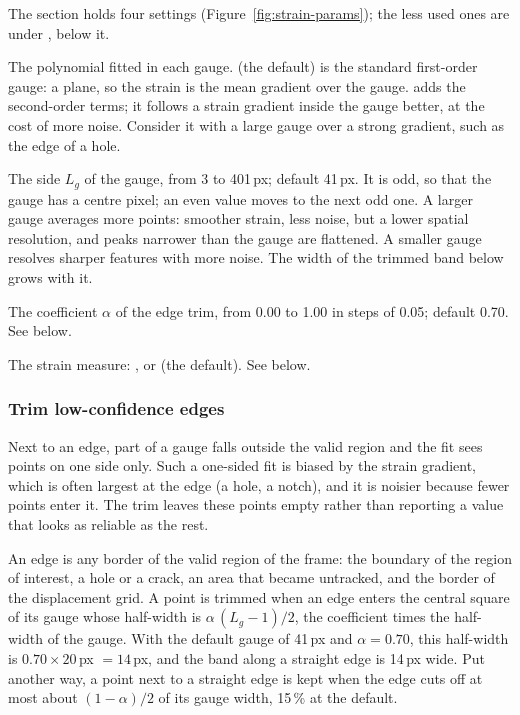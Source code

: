 The section holds four settings (Figure~\ref{fig:strain-params}); the less used ones are under
, below it.

\begin{description}[leftmargin=1.2cm,style=nextline]
  \item[Method]
    The polynomial fitted in each gauge.  (the default) is the standard
    first-order gauge: a plane, so the strain is the mean gradient over the gauge.
     adds the second-order terms; it follows a strain gradient inside the
    gauge better, at the cost of more noise. Consider it with a large gauge over a strong
    gradient, such as the edge of a hole.
  \item[VSG size]
    The side $L_g$ of the gauge, from 3 to 401\,px; default 41\,px. It is odd, so that the gauge
    has a centre pixel; an even value moves to the next odd one. A larger gauge averages more
    points: smoother strain, less noise, but a lower spatial resolution, and peaks narrower than
    the gauge are flattened. A smaller gauge resolves sharper features with more noise. The width
    of the trimmed band below grows with it.
  \item[Trim low-confidence edges]
    The coefficient $\alpha$ of the edge trim, from 0.00 to 1.00 in steps of 0.05; default 0.70.
    See below.
  \item[Strain type]
    The strain measure: ,  or  (the default).
    See below.
\end{description}

\subsubsection*{Trim low-confidence edges}
\label{sec:edge-trim}

Next to an edge, part of a gauge falls outside the valid region and the fit sees points on one
side only. Such a one-sided fit is biased by the strain gradient, which is often largest at the
edge (a hole, a notch), and it is noisier because fewer points enter it. The trim leaves these
points empty rather than reporting a value that looks as reliable as the rest.

An edge is any border of the valid region of the frame: the boundary of the region of interest,
a hole or a crack, an area that became untracked, and the border of the displacement grid. A point
is trimmed when an edge enters the central square of its gauge whose half-width is
$\alpha\,(L_g - 1)/2$, the coefficient times the half-width of the gauge. With the default gauge
of 41\,px and $\alpha = 0.70$, this half-width is $0.70 \times 20$\,px $= 14$\,px, and the band
along a straight edge is 14\,px wide. Put another way, a point next to a straight edge is kept
when the edge cuts off at most about $(1-\alpha)/2$ of its gauge width, 15\,\% at the default.

